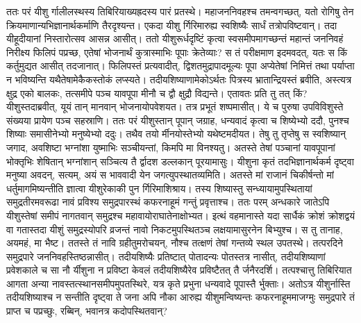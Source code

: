 \adhyAya
{}
\vakya ततः परं यीशु र्गालीलस्थस्य तिबिरियाख्यह्रदस्य पारं प्रतस्थे।
\vakya महाजननिवहश्च तमन्वगच्छत्, यतो रोगिषु तेन क्रियमाणान्यभिज्ञानार्थकर्माणि तैरदृश्यन्त।
\vakya एकदा यीशु र्गिरिमारुह्य स्वशिष्यैः सार्धं तत्रोपविष्टवान्।
\vakya तदा यीहूदीयानां निस्तारोत्सव आसन्न आसीत्।
\vakya ततो यीशुरूर्धदृष्टिं कृत्वा स्वसमीपमागच्छन्तं महान्तं जननिवहं निरीक्ष्य फिलिपं पप्रच्छ, एतेषां भोजनार्थं कुत्रास्माभिः पूपाः क्रेतेव्याः?
\vakya स तं परीक्षमाण इदमवदत्, यतः स किं कर्तुमुद्यत आसीत् तदजानात्।
\vakya फिलिपस्तं प्रत्यवादीत्, द्विशतमुद्रापादमूल्यः पूपा अप्येतेषां निमित्तं तथा पर्याप्ता न भविष्यन्ति यथैतेषामेकैकस्तोकं लप्स्यते।
\vakya तदीयशिष्याणामेकोऽर्थतः पित्रस्य भ्रातान्द्रियस्तं ब्रवीति,
\vakya अस्त्यत्र क्षुद्र एको बालकः, तत्समीपे पञ्च यावपूपा मीनौ च द्वौ क्षुद्रौ विद्यन्ते। एतावतः प्रति तु तत् किं?
\vakya यीशुस्तदाब्रवीत्, यूयं तान् मानवान् भोजनायोपवेशयत। तत्र प्रभूतं शष्पमासीत्। ये च पुरुषा उपविविशुस्ते संख्यया प्रायेण पञ्च सहस्राणि।
\vakya ततः परं यीशुस्तान् पूपान् जग्राह, धन्यवादं कृत्वा च शिष्येभ्यो ददौ, पुनश्च शिष्याः समासीनेभ्यो मनुष्येभ्यो ददुः। तथैव तयो र्मीनयोस्तेभ्यो यथेष्टमदीयत।
\vakya तेषु तु तृप्तेषु स स्वशिष्यान् जगाद, अवशिष्टा भग्नांशा युष्माभिः सञ्चीयन्तां, किमपि मा विनश्यतु।
\vakya अतस्ते तेषां पञ्चानां यावपूपानां भोक्तृभिः शेषितान् भग्नांशान् सञ्चित्य तै र्द्वादश डल्लकान् पूरयामासुः।
\vakya यीशुना कृतं तदभिज्ञानार्थकर्म दृष्ट्वा मनुष्या अवदन्, सत्यम्, अयं स भाववादी येन जगत्युपस्थातव्यमिति।
\vakya अतस्ते मां राजानं चिकीर्षन्तो मां धर्तुमागमिष्यन्तीति ज्ञात्वा यीशुरेकाकी पुन र्गिरिमाशिश्राय।
\vakya तस्य शिष्यास्तु सन्ध्यायामुपस्थितायां समुद्रतीरमवरूढा नावं प्रविश्य समुद्रपारस्थं कफरनाहूमं गन्तुं प्रवृत्ताश्च।
\vakya ततः परम् अन्धकारे जातेऽपि यीशुस्तेषां समीपं नागतवान्
\vakya समुद्रश्च महावायोराघातेनाक्षोभ्यत।
\vakya इत्थं वहमानास्ते यदा सार्धैकं क्रोशं क्रोशद्वयं वा गतास्तदा यीशुं समुद्रस्योपरि व्रजन्तं नावो निकटमुपस्थितञ्च लक्षयामासुरनेन बिभ्युश्च।
\vakya स तु तानाह, अयमहं, मा भैष्ट।
\vakya ततस्ते तं नावि ग्रहीतुमरोचयन्, नौश्च तत्क्षणं तेषां गन्तव्ये स्थल उपतस्थे।
\vakya तत्परदिने समुद्रपारे जननिवहस्तिष्ठन्नासीत्। तदीयशिष्यैः प्रतिष्टात् पोतादन्यः पोतस्तत्र नासीत्, तदीयशिष्याणां प्रवेशकाले च सा नौ र्यीशुना न प्रविष्टा केवलं तदीयशिष्यैरेव प्रविष्टैतत् तै र्जनैरदर्शि।
\vakya तत्पश्चात्तु तिबिरियात आगता अन्या नावस्तत्स्थानसमीपमुपतस्थिरे, यत्र कृते प्रभुना धन्यवादे पूपास्तै र्भुक्ताः।
\vakya अतोऽत्र यीशुर्नास्ति तदीयशिष्याश्च न सन्तीति दृष्ट्वा ते जना अपि नौका आरुह्य यीशुमन्विष्यन्तः कफरनाहूममाजग्मुः
\vakya समुद्रपारे तं प्राप्त च पप्रच्छुः, रब्बिन्, भवानत्र कदोपस्थितवान्?
